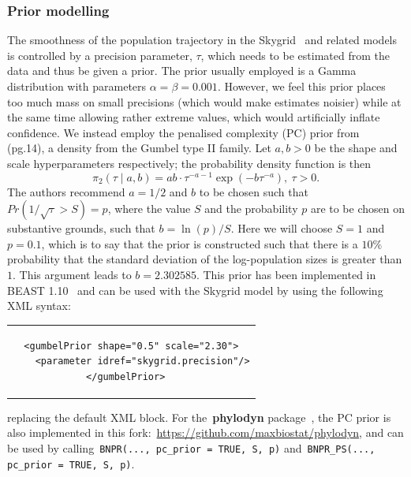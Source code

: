 \documentclass[a4paper,10pt]{article}
\begin{document}
\subsubsection*{Prior modelling}

The smoothness of the population trajectory in the Skygrid~\citep{M-Gill2012} %
and related models is controlled by a precision parameter, $\tau$, which needs to be estimated from the data and thus be given a prior.
The prior usually employed is a Gamma distribution with parameters $\alpha = \beta = 0.001$. 
However, we feel this prior places too much mass on small precisions (which would make estimates noisier) while at the same time allowing rather extreme values, which would artificially inflate confidence.
We instead employ the penalised complexity (PC) prior from~\citet{M-Simpson2017} (pg.14), a density from the Gumbel type II family.
Let $a, b > 0$ be the shape and scale hyperparameters respectively; the probability density function is then
\begin{equation}
 \pi_2(\tau \mid a, b) = ab \cdot \tau^{-a-1}\exp\left(-b\tau^{-a}\right),\: \tau > 0.
\end{equation}
The authors recommend $a = 1/2$ and $b$ to be chosen such that $Pr(1/\sqrt{\tau} > S) = p$, where the value $S$ and the probability $p$ are to be chosen on substantive grounds, such that $b = \ln(p)/S$.
Here we will choose $S = 1$ and $p = 0.1$, which is to say that the prior is constructed such that there is a $10\%$ probability that the standard deviation of the log-population sizes is greater than $1$.
This argument leads to $b = 2.302585$.
This prior has been implemented in BEAST 1.10~\citep{M-Suchard2018} and can be used with the Skygrid model by using the following XML syntax:
\lstset{language=XML}
\begin{center}
\begin{tabular}{c}
\begin{lstlisting}
<gumbelPrior shape="0.5" scale="2.30">
    <parameter idref="skygrid.precision"/>
</gumbelPrior>	
\end{lstlisting}
\end{tabular}
\end{center}
replacing the default XML block.
For the~\textbf{phylodyn} package~\citep{M-Karcher2017}, the PC prior is also implemented in this fork:~\url{https://github.com/maxbiostat/phylodyn}, and can be used by calling~\verb|BNPR(..., pc_prior = TRUE, S, p)| and~\verb|BNPR_PS(..., pc_prior = TRUE, S, p)|.
\end{document}
